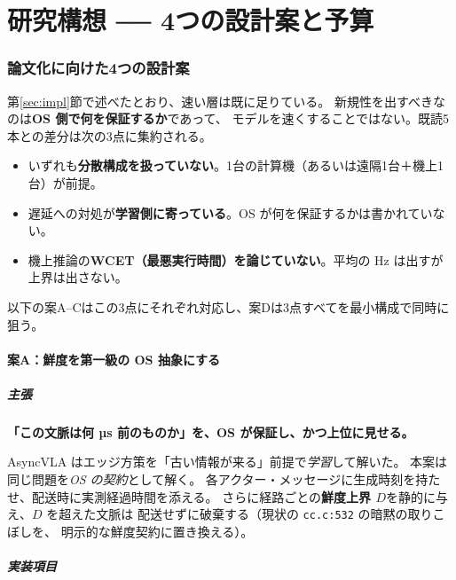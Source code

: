 \documentclass[11pt,a4paper]{article}
\newcommand{\code}[1]{\texttt{#1}}
\newcommand{\prob}[1]{\textbf{\textcolor{red!55!black}{#1}}}
\newcommand{\keyp}[1]{\textbf{\textcolor{blue!45!black}{#1}}}
\begin{document}
\part{研究構想 ── 4つの設計案と予算}
\label{part:design}

\section{論文化に向けた4つの設計案}

第\ref{sec:impl}節で述べたとおり、速い層は既に足りている。
新規性を出すべきなのは\keyp{OS 側で何を保証するか}であって、
モデルを速くすることではない。既読5本との差分は次の3点に集約される。

\begin{itemize}[leftmargin=1.4em,itemsep=2pt]
  \item いずれも\prob{分散構成を扱っていない}。1台の計算機（あるいは遠隔1台＋機上1台）が前提。
  \item 遅延への対処が\prob{学習側に寄っている}。OS が何を保証するかは書かれていない。
  \item 機上推論の\prob{WCET（最悪実行時間）を論じていない}。平均の Hz は出すが上界は出さない。
\end{itemize}

以下の案A--Cはこの3点にそれぞれ対応し、案Dは3点すべてを最小構成で同時に狙う。

\subsection{案A：鮮度を第一級の OS 抽象にする}

\subsubsection*{主張}

\keyp{「この文脈は何 µs 前のものか」を、OS が保証し、かつ上位に見せる。}

AsyncVLA はエッジ方策を「古い情報が来る」前提で\emph{学習}して解いた。
本案は同じ問題を\emph{OS の契約}として解く。
各アクター・メッセージに生成時刻を持たせ、配送時に実測経過時間を添える。
さらに経路ごとの\keyp{鮮度上界 $D$}を静的に与え、$D$ を超えた文脈は
配送せずに破棄する（現状の \code{cc.c:532} の暗黙の取りこぼしを、
明示的な鮮度契約に置き換える）。

\subsubsection*{実装項目}
\end{document}
